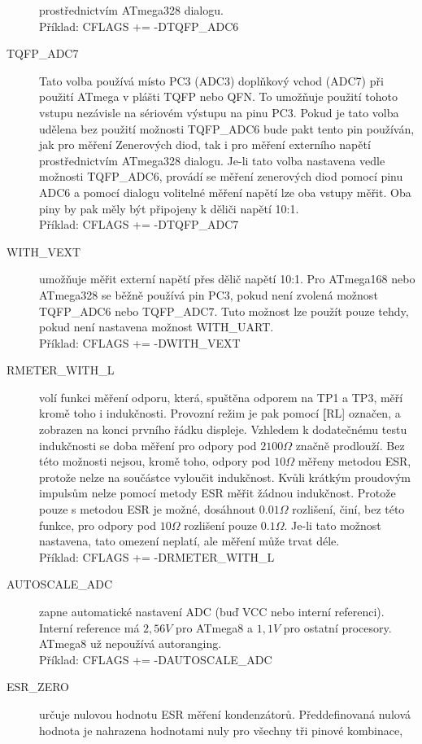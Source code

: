 \begin{description}
prostřednictvím  ATmega328 dialogu.\\
Příklad: CFLAGS += -DTQFP\_ADC6
  \item[TQFP\_ADC7] Tato volba používá místo PC3 (ADC3) doplňkový vchod (ADC7) při použití
ATmega v plášti TQFP nebo QFN.
To umožňuje použití tohoto vstupu nezávisle na sériovém výstupu na pinu PC3.
Pokud je tato volba udělena bez použití možnosti TQFP\_ADC6 bude pakt tento pin používán,
jak pro měření Zenerových diod, tak i pro měření externího napětí prostřednictvím ATmega328 dialogu.
Je-li tato volba nastavena vedle možnosti TQFP\_ADC6, provádí se měření zenerových diod
pomocí pinu ADC6 a  pomocí dialogu volitelné měření napětí lze oba vstupy měřit.
Oba piny by pak měly být připojeny k děliči napětí 10:1.\\
Příklad: CFLAGS += -DTQFP\_ADC7
  \item[WITH\_VEXT]  umožňuje měřit externí napětí přes dělič napětí 10:1.
Pro ATmega168 nebo ATmega328 se běžně používá pin PC3,
pokud není zvolená možnost TQFP\_\discretionary{}{}{}ADC6 nebo TQFP\_\discretionary{}{}{}ADC7.
Tuto možnost lze použít pouze tehdy, pokud není nastavena možnost WITH\_UART.\\
Příklad: CFLAGS += -DWITH\_VEXT 
  \item[RMETER\_WITH\_L] volí funkci měření odporu, která, spuštěna odporem na TP1 a TP3,
měří kromě toho i indukčnosti.
Provozní režim je pak pomocí {\textbf[RL]} označen, a zobrazen na konci prvního řádku displeje.
Vzhledem k dodatečnému testu indukčnosti se doba měření pro odpory pod \(2100\Omega\) značně prodlouží.
Bez této možnosti nejsou, kromě toho, odpory pod \(10\Omega\) měřeny metodou ESR,
protože  nelze na součástce vyloučit indukčnost.
Kvůli krátkým proudovým impulsům nelze pomocí metody ESR měřit žádnou indukčnost.
Protože pouze s metodou ESR je možné, dosáhnout \(0.01\Omega\) rozlišení, činí, bez této funkce,
pro odpory pod \(10\Omega\) rozlišení pouze \(0.1\Omega\).
Je-li tato možnost nastavena, tato omezení neplatí, ale měření může trvat déle.\\
Příklad: CFLAGS += -DRMETER\_WITH\_L
  \item[AUTOSCALE\_ADC] zapne automatické nastavení ADC (buď VCC nebo interní referenci).
Interní reference má \(2,56V\) pro ATmega8 a \(1,1V\) pro ostatní procesory.
ATmega8 už nepoužívá autoranging.\\
Příklad: CFLAGS += -DAUTOSCALE\_ADC
  \item[ESR\_ZERO] určuje nulovou hodnotu ESR měření kondenzátorů.
Předdefinovaná nulová hodnota je nahrazena hodnotami nuly pro všechny tři pinové kombinace,

\end{description}
